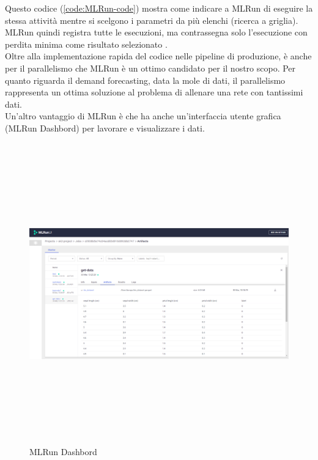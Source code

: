 \documentclass[12pt,a4paper]{report}
\begin{document}
Questo codice (\ref{code:MLRun-code}) mostra come indicare a MLRun di eseguire la stessa attività mentre si scelgono i parametri da più elenchi (ricerca a griglia). MLRun quindi registra tutte le esecuzioni, ma contrassegna solo l'esecuzione con perdita minima come risultato selezionato \cite{MLRun}.
\\
Oltre alla implementazione rapida del codice nelle pipeline di produzione, è anche per il parallelismo che MLRun è un ottimo candidato per il nostro scopo. Per quanto riguarda il demand forecasting, data la mole di dati, il parallelismo rappresenta un ottima soluzione al problema di allenare una rete con tantissimi dati.\\
Un'altro vantaggio di MLRun è che ha anche un'interfaccia utente grafica (MLRun Dashbord) per lavorare e visualizzare i dati.
\begin{figure}[h!]
    \begin{center}
        \includegraphics[width=13cm,height=13cm,keepaspectratio]{MLRun Dashbord}
    \end{center}
    \caption{MLRun Dashbord}
    \label{fig:MLRun-dashbord}
\end{figure}
\end{document}
